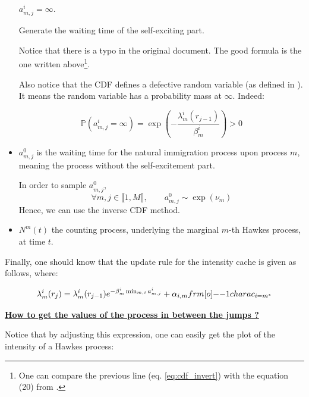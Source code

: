 \begin{itemize}
\begin{algorithm}[H]
{$ a ^i_{m,j} = \infty $.}
\caption{Generate the waiting time of the self-exciting part.}
\end{algorithm}


Notice that there is a typo in the original document. The good formula is the one written above\footnote{One can compare the previous line (eq. \ref{eq:cdf_invert}) with the equation (20) from \cite{my_algo_simul}.}.

Also notice that the CDF defines a defective random variable (as defined in \cite{my_algo_simul}). It means the random variable has a probability mass at $\infty$. Indeed:

$$ \mathbb P ( a^i_{m,j} = \infty ) = \exp \left ( - \frac { \lambda^i_m ( r_{j-1} ) } { \beta_m^i } \right ) > 0 $$



\item $a_{m,j}^0$ is the waiting time for the natural immigration process upon process $m$, meaning the process without the self-excitement part. 

\begin{remarque}
In order to sample $a^0_{m,j}$,
$$\forall m,j \in  \llbracket 1, M \rrbracket, \qquad a_{m,j}^0 \sim \exp( \nu_m )$$
Hence, we can use the inverse CDF method. 
\end{remarque}

\item $N^{m} (t) $ the counting process, underlying the marginal $m$-th Hawkes process, at time $t$.
\end{itemize}


Finally, one should know that the update rule for the intensity cache is given as follows, where:

\begin{equation}
\lambda_m^i ( r_j ) = \lambda_m^i ( r_{j-1} )  e^{ - \beta_m^i \min_{m,i} a_{m,j}^i } + \alpha_{i,m} \11charac_{i = m^*}
\label{eq:update_lambda} 
\end{equation}

\underline{ \textbf{How to get the values of the process in between the jumps ?} }

Notice that by adjusting this expression, one can easily get the plot of the intensity of a Hawkes process:

